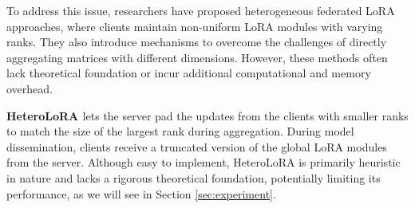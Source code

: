 \documentclass{article} %
\theoremstyle{plain}
\theoremstyle{definition}
\begin{document}
To address this issue, researchers have proposed heterogeneous federated LoRA approaches, where clients maintain non-uniform LoRA modules with varying ranks. They also introduce mechanisms to overcome the challenges of directly aggregating matrices with different dimensions.   
However, these methods often lack theoretical foundation or incur additional computational and memory overhead.

\textbf{HeteroLoRA \citep{cho2024heterogeneouslorafederatedfinetuning}} lets the server pad the updates from the clients with smaller ranks to match the size of the largest rank during aggregation. During model dissemination, clients receive a truncated version of the global LoRA modules from the server. Although easy to implement, HeteroLoRA is primarily heuristic in nature and lacks a rigorous theoretical foundation, potentially limiting its performance, as we will see in Section \ref{sec:experiment}.

\end{document}

